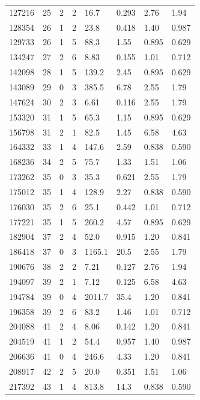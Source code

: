 \documentclass[preview]{standalone}
\begin{document}
{{{\begin{tabular}{L{1.2cm}C{1.2cm} C{0.3cm}C{0.5cm} C{1.4cm}C{1.4cm} C{1.4cm}C{1.4cm}}
  127216  &    25  & 2     &  2 &  16.7  & 0.293  & 2.76 &  1.94   \\ 
  128354  &    26  & 1     &  2 &  23.8  & 0.418  & 1.40 &  0.987   \\ 
  129733  &    26  & 1     &  5 &  88.3  & 1.55  & 0.895 &  0.629   \\ 
  134247  &    27  & 2     &  6 &  8.83  & 0.155  & 1.01 &  0.712   \\ 
  142098  &    28  & 1     &  5 &  139.2  & 2.45  & 0.895 &  0.629   \\ 
  143089  &    29  & 0     &  3 &  385.5  & 6.78  & 2.55 &  1.79   \\ 
  147624  &    30  & 2     &  3 &  6.61  & 0.116  & 2.55 &  1.79   \\ 
  153320  &    31  & 1     &  5 &  65.3  & 1.15  & 0.895 &  0.629   \\ 
  156798  &    31  & 2     &  1 &  82.5  & 1.45  & 6.58 &  4.63   \\ 
  164332  &    33  & 1     &  4 &  147.6  & 2.59  & 0.838 &  0.590   \\ 
  168236  &    34  & 2     &  5 &  75.7  & 1.33  & 1.51 &  1.06   \\ 
  173262  &    35  & 0     &  3 &  35.3  & 0.621  & 2.55 &  1.79   \\ 
  175012  &    35  & 1     &  4 &  128.9  & 2.27  & 0.838 &  0.590   \\ 
  176030  &    35  & 2     &  6 &  25.1  & 0.442  & 1.01 &  0.712   \\ 
  177221  &    35  & 1     &  5 &  260.2  & 4.57  & 0.895 &  0.629   \\ 
  182904  &    37  & 2     &  4 &  52.0  & 0.915  & 1.20 &  0.841   \\ 
  186418  &    37  & 0     &  3 &  1165.1  & 20.5  & 2.55 &  1.79   \\ 
  190676  &    38  & 2     &  2 &  7.21  & 0.127  & 2.76 &  1.94   \\ 
  194097  &    39  & 2     &  1 &  7.12  & 0.125  & 6.58 &  4.63   \\ 
  194784  &    39  & 0     &  4 &  2011.7  & 35.4  & 1.20 &  0.841   \\ 
  196358  &    39  & 2     &  6 &  83.2  & 1.46  & 1.01 &  0.712   \\ 
  204088  &    41  & 2     &  4 &  8.06  & 0.142  & 1.20 &  0.841   \\ 
  204519  &    41  & 1     &  2 &  54.4  & 0.957  & 1.40 &  0.987   \\ 
  206636  &    41  & 0     &  4 &  246.6  & 4.33  & 1.20 &  0.841   \\ 
  208917  &    42  & 2     &  5 &  20.0  & 0.351  & 1.51 &  1.06   \\ 
  217392  &    43  & 1     &  4 &  813.8  & 14.3  & 0.838 &  0.590   \\ 
\hline 
\end{tabular} 

}}}
\end{document}
